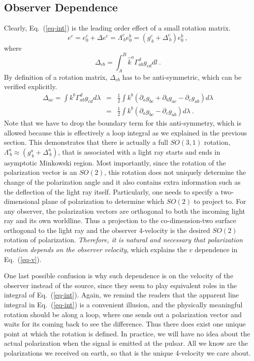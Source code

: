 \documentclass[aps,showpacs,twocolumn,floats,prd,superscriptaddress,nofootinbib]{revtex4}
\begin{document}
\subsection{Observer Dependence}

Clearly, Eq.~(\ref{eq-int}) is the leading order effect of a small rotation matrix.
\begin{equation}
e^c = e_0^c + \Delta e^c = \Lambda^c_{\ b} e_0^b = 
\left( g^c_{\ b} + \Delta^c_{\ b} \right) e_0^b~,
\end{equation}
where
\begin{equation}
\Delta_{cb} = \int_A^B \hat{k}^a \Gamma^d_{ab} g_{cd}dl~.
\end{equation}
By definition of a rotation matrix, $\Delta_{cb}$ has to be anti-symmetric, which can be verified explicitly.
\begin{eqnarray}
\Delta_{ac} = \int k^b\Gamma_{ab}^d g_{cd}d\lambda &=& 
\frac{1}{2} \int k^b \left(\partial_a g_{bc} + \partial_bg_{ac} - \partial_c g_{ab}\right)d\lambda
\label{eq-Delta} \nonumber \\
&=& \frac{1}{2} \int k^b \left(\partial_a g_{bc} - \partial_c g_{ab}\right)d\lambda~.
\end{eqnarray}
Note that we have to drop the boundary term for this anti-symmetry, which is allowed because this is effectively a loop integral as we explained in the previous section.
This demonstrates that there is actually a full $SO(3,1)$ rotation, $\Lambda^a_{\ b}\approx\left(g^a_{\ b} + \Delta^a_{\ b}\right)$, that is associated with a light ray starts and ends in asymptotic Minkowski region. 
Most importantly, since the rotation of the polarization vector is an $SO(2)$, this rotation does not uniquely determine the change of the polarization angle and it also contains extra information such as the deflection of the light ray itself. 
Particularly, one needs to specify a two-dimensional plane of polarization to determine which $SO(2)$ to project to. 
For any observer, the polarization vectors are orthogonal to both the incoming light ray and its own worldline. 
Thus a projection to the co-dimension-two surface orthogonal to the light ray and the observer 4-velocity is the desired $SO(2)$ rotation of polarization. 
{\it Therefore, it is natural and necessary that polarization rotation depends on the observer velocity}, which explains the $v$ dependence in Eq.~(\ref{eq-v}).

One last possible confusion is why such dependence is on the velocity of the observer instead of the source, since they seem to play equivalent roles in the integral of Eq.~(\ref{eq-int}). 
Again, we remind the readers that the apparent line integral in Eq.~(\ref{eq-int}) is a convenient illusion, 
and the physically meaningful rotation should be along a loop, where one sends out a polarization vector and waits for its  coming back to see the difference. 
Thus there does exist one unique point at which the rotation is defined. 
In practice, we will have no idea about the actual polarization when the signal is emitted at the pulsar. 
All we know are the polarizations we received on earth, so that is the unique 4-velocity we care about.
\end{document}
